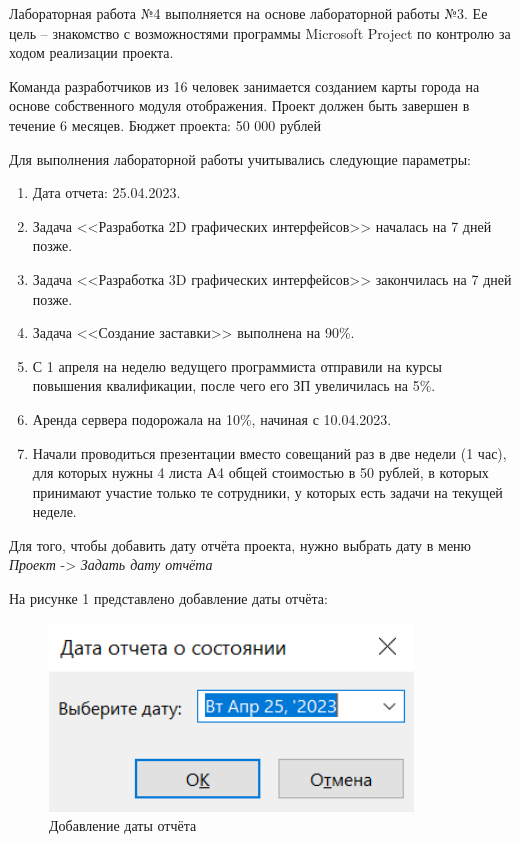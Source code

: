Лабораторная работа №4 выполняется на основе лабораторной работы №3.
Ее цель – знакомство с возможностями программы Microsoft Project по контролю за ходом реализации проекта.

Команда разработчиков из 16 человек занимается созданием карты города на основе собственного модуля отображения. 
Проект должен быть завершен в течение 6 месяцев. Бюджет проекта: 50 000 рублей

Для выполнения лабораторной работы учитывались следующие параметры:
\begin{enumerate}
	\item Дата отчета: 25.04.2023.
	\item Задача <<Разработка 2D графических интерфейсов>> началась на 7 дней позже.
	\item Задача <<Разработка 3D графических интерфейсов>> закончилась на 7 дней позже.
	\item Задача <<Создание заставки>> выполнена на 90\%.
	\item С 1 апреля на неделю ведущего программиста отправили на курсы повышения квалификации, после чего его ЗП увеличилась на 5\%.
	\item Аренда сервера подорожала на 10\%, начиная с 10.04.2023.
	\item Начали проводиться презентации вместо совещаний раз в две недели (1 час), для которых нужны 4 листа А4 общей стоимостью в 50 рублей, в которых принимают участие только те сотрудники, у которых есть задачи на текущей неделе.
\end{enumerate}

\newpage
{}
Для того, чтобы добавить дату отчёта проекта, нужно выбрать дату в меню \textit{Проект} -> \textit{Задать дату отчёта}

На рисунке 1 представлено добавление даты отчёта:
\FloatBarrier
\begin{figure}[h]	
	\begin{center}
		\includegraphics[height=5cm]{inc/point.png}
	\end{center}
	\captionsetup{justification=centering}
	\caption{Добавление даты отчёта}
\end{figure}
\FloatBarrier 

